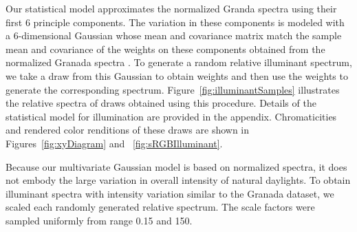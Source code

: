 \documentclass{jov}
\begin{document}
Our statistical model approximates the normalized Granda spectra using their first 6 principle components.
The variation in these components is modeled with a 6-dimensional Gaussian whose mean and covariance matrix 
match the sample mean and covariance of the weights on these components obtained from the normalized Granada spectra \cite{BrainardFreeman}.
To generate a random relative illuminant spectrum, we take a draw from this Gaussian to obtain weights and then use the weights to generate the corresponding spectrum.
Figure~\ref{fig:illuminantSamples} illustrates the relative spectra of draws obtained using this procedure.
Details of the statistical model for illumination are provided in the appendix.
Chromaticities and rendered color renditions of these draws are shown in Figures~\ref{fig:xyDiagram} and ~\ref{fig:sRGBIlluminant}.

Because our multivariate Gaussian model is based on normalized spectra, it does not embody the large variation in overall intensity of natural daylights.
To obtain illuminant spectra with intensity variation similar to the Granada dataset, we scaled each randomly generated relative spectrum.
The scale factors were sampled uniformly from range 0.15 and 150.
\end{document}
